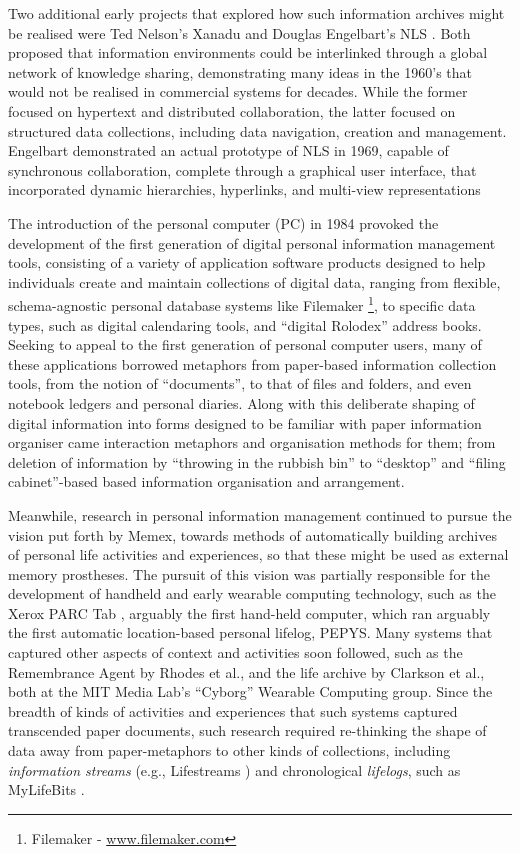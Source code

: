 \documentclass[graybox]{svmult}
\begin{document}
Two additional early projects that explored how such information archives might be realised were Ted Nelson’s Xanadu \cite{nelson1987literary} and Douglas Engelbart's NLS \cite{engelbart1968research}.  Both proposed that information environments could be interlinked through a global network of knowledge sharing, demonstrating many ideas in the 1960’s that would not be realised in commercial systems for decades.  While the former focused on hypertext and distributed collaboration, the latter focused on structured data collections, including data navigation, creation and management.  Engelbart demonstrated an actual prototype of NLS in 1969, capable of synchronous collaboration, complete through a graphical user interface, that incorporated dynamic hierarchies, hyperlinks, and multi-view representations  

The introduction of the personal computer (PC) in 1984 provoked the development of the first generation of digital personal information management tools, consisting of a variety of application software products designed to help individuals create and maintain collections of digital data, ranging from flexible, schema-agnostic personal database systems like Filemaker \footnote{Filemaker - \url{www.filemaker.com}}, to specific data types, such as digital calendaring tools, and ``digital Rolodex'' address books.  Seeking to appeal to the first generation of personal computer users, many of these applications borrowed metaphors from paper-based information collection tools, from the notion of ``documents'', to that of files and folders, and even notebook ledgers and personal diaries. Along with this deliberate shaping of digital information into forms designed to be familiar with paper information organiser came interaction metaphors and organisation methods for them; from deletion of information by ``throwing in the rubbish bin'' to ``desktop'' and ``filing cabinet''-based based information organisation and arrangement.

Meanwhile, research in personal information management continued to pursue the vision put forth by Memex, towards methods of automatically building archives of personal life activities and experiences, so that these might be used as external memory prostheses.  The pursuit of this vision was partially responsible for the development of handheld and early wearable computing technology, such as the Xerox PARC Tab \cite{schilit1993parctab}, arguably the first hand-held computer, which ran arguably the first automatic location-based personal lifelog, PEPYS\cite{newman1991pepys}.  Many systems that captured other aspects of context and activities soon followed, such as the Remembrance Agent by Rhodes et al., and the life archive by Clarkson et al., both at the MIT Media Lab's ``Cyborg'' Wearable Computing group. Since the breadth of kinds of activities and experiences that such systems captured transcended paper documents, such research required re-thinking the shape of data away from paper-metaphors to other kinds of collections, including \emph{information streams} (e.g., Lifestreams \cite{fertig1996lifestreams}) and chronological \emph{lifelogs}, such as MyLifeBits \cite{gemmell2002mylifebits}.
\end{document}
